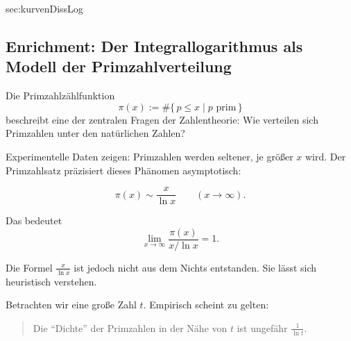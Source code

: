 \documentclass[../Mathe_Aufgaben.tex]{subfiles}
\begin{document}
\begin{komplexaufgaben}{sec:kurvenDissLog}
{		}
	\end{komplexaufgaben}

	\subsection{Enrichment: Der Integrallogarithmus als Modell der Primzahlverteilung}

Die Primzahlzählfunktion
\[
\pi(x):=\#\{\,p\le x \mid p \text{ prim}\,\}
\]
beschreibt eine der zentralen Fragen der Zahlentheorie:
Wie verteilen sich Primzahlen unter den natürlichen Zahlen?

Experimentelle Daten zeigen:
Primzahlen werden seltener, je größer $x$ wird.
Der Primzahlsatz präzisiert dieses Phänomen asymptotisch:

\[
\pi(x)\sim \frac{x}{\ln x}
\qquad (x\to\infty).
\]

Das bedeutet
\[
\lim_{x\to\infty}\frac{\pi(x)}{x/\ln x}=1.
\]

\medskip

Die Formel $\frac{x}{\ln x}$ ist jedoch nicht aus dem Nichts entstanden.
Sie lässt sich heuristisch verstehen.

Betrachten wir eine große Zahl $t$.
Empirisch scheint zu gelten:

\begin{quote}
Die ``Dichte'' der Primzahlen in der Nähe von $t$ ist ungefähr $\frac{1}{\ln t}$.
\end{quote}
\end{document}
